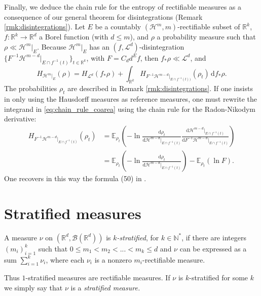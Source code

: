 \documentclass[runningheads]{llncs}
\newcommand{\Exx}[2]{\mathbb{E}_{#1}\left(#2\right)}
\newcommand{\diff}[2]{\frac{\mathrm{d}  #1}{\mathrm{d}  #2}}
\def \d{\mbox{\(\,\mathrm{d}\)}}
\newcommand{\Rr}{\mathbb{R}}
\newcommand{\Nn}{\mathbb{N}}
\begin{document}
Finally, we deduce the chain rule for the entropy of rectifiable measures as a consequence of our general theorem for disintegrations (Remark \ref{rmk:disintegrations}). Let $E$ be a countably  $(\mathcal H^m,m)$-rectifiable subset of $\Rr^k$, $f:\Rr^k\to \Rr^d$  a Borel function (with $d\leq m$), and $\rho$ a probability measure such that $\rho \ll \mathcal H^m|_E$. Because $\mathcal H^m |_E$ has an $(f,\mathcal L^d)$-disintegration $\{F^{-1} \mathcal H^{m-d}|_{E\cap f^{-1}(t)}\}_{t\in \Rr^k}$, with $F=C_d d^E f$, then $f_*\rho \ll \mathcal L^d$, and 
\begin{equation}\label{eq:chain_rule_coarea}
    H_{\mathcal H^m|_E} (\rho) = H_{\mathcal L^d}(f_*\rho) + \int_{\Rr^k} H_{F^{-1} \mathcal H^{m-d}|_ {E\cap f^{-1}(t))}}(\rho_t) \d f_*\rho. 
\end{equation}
The probabilities $\rho_t$ are described in Remark \ref{rmk:disintegrations}. If one insists in only using the Hausdorff measures as reference measures, one must rewrite the integrand in \eqref{eq:chain_rule_coarea} using the chain rule for the Radon-Nikodym derivative:
\begin{align*}
    H_{F^{-1} \mathcal H^{m-d} |_{E\cap f^{-1}(t)}}(\rho_t) &= \Exx{\rho_t}{-\ln \diff{\rho_t}{\mathcal H^{m-d}|_{E\cap f^{-1}(t)}} \diff{\mathcal H^{m-d}|_{E\cap f^{-1}(t)}}{F^{-1} \mathcal H^{m-d}|_{E\cap f^{-1}(t)}}}\\
    &= \Exx{\rho_t}{-\ln \diff{\rho_t}{\mathcal H^{m-d}|_{E\cap f^{-1}(t)}} } - \Exx{\rho_t}{\ln F}.
\end{align*}
One recovers in this way the formula (50) in \cite{Koliander2016}.

\section{Stratified measures}

\begin{definition}\label{def:stratified_meas}
A measure $\nu$ on $(\Rr^d,\mathcal B(\Rr^d))$ is \emph{$k$-stratified}, for $k\in \Nn^*$,  if there are integers $(m_i)_{i=1}^k$ such that  $0 \leq m_1 < m_2 <... <m_k \leq d$ and $\nu$ can be expressed as a sum $\sum_{i=1}^k \nu_i$, where each $\nu_i$ is a nonzero $m_i$-rectifiable measure.
\end{definition}

Thus  $1$-stratified measures are rectifiable measures. If $\nu$ is $k$-stratified for some $k$ we simply say that $\nu$ is a \emph{stratified measure.}
\end{document}
